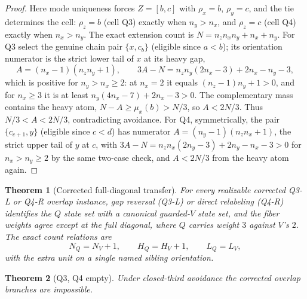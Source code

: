 \documentclass[11pt]{article}
\newtheorem{theorem}{Theorem}[section]
\theoremstyle{definition}
\theoremstyle{remark}
\begin{document}
\begin{proof}
Here mode uniqueness forces $Z=[b,c]$ with $\rho_x=b$, $\rho_y=c$, and the tie
determines the cell: $\rho_z=b$ (cell Q3) exactly when $n_y>n_x$, and $\rho_z=c$ (cell
Q4) exactly when $n_x>n_y$. The exact extension count is $N=n_zn_xn_y+n_x+n_y$. For Q3
select the genuine chain pair $\{x,c_b\}$ (eligible since $a<b$); its orientation
numerator is the strict lower tail of $x$ at its heavy gap,
\[
A=(n_x-1)(n_zn_y+1),\qquad
3A-N=n_zn_y(2n_x-3)+2n_x-n_y-3,
\]
which is positive for $n_y>n_x\ge2$: at $n_x=2$ it equals $(n_z-1)n_y+1>0$, and for
$n_x\ge3$ it is at least $n_y(4n_x-7)+2n_x-3>0$. The complementary mass contains the
heavy atom, $N-A\ge\mu_x(b)>N/3$, so $A<2N/3$. Thus $N/3<A<2N/3$, contradicting
avoidance. For Q4, symmetrically, the pair $\{c_{c+1},y\}$ (eligible since $c<d$) has
numerator $A=(n_y-1)(n_zn_x+1)$, the strict upper tail of $y$ at $c$, with
$3A-N=n_zn_x(2n_y-3)+2n_y-n_x-3>0$ for $n_x>n_y\ge2$ by the same two-case check, and
$A<2N/3$ from the heavy atom again.
\end{proof}

\begin{theorem}[Corrected full-diagonal transfer]\label{thm:qtransfer}
For every realizable corrected Q3-L or Q4-R overlap instance, gap reversal (Q3-L) or
direct relabeling (Q4-R) identifies the $Q$ state set with a canonical guarded-$V$ state
set, and the fiber weights agree except at the full diagonal, where $Q$ carries weight
$3$ against $V$'s $2$. The exact count relations are
\[
N_Q=N_V+1,\qquad H_Q=H_V+1,\qquad L_Q=L_V,
\]
with the extra unit on a single named sibling orientation.
\end{theorem}

\begin{theorem}[Q3, Q4 empty]\label{thm:q34}
Under closed-third avoidance the corrected overlap branches are impossible.
\end{theorem}
\end{document}
